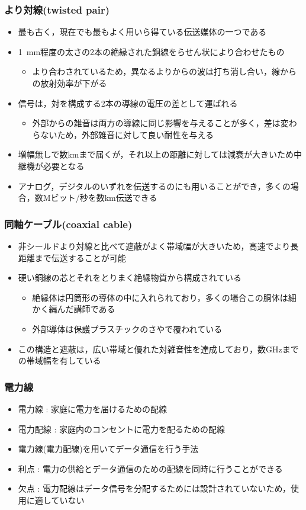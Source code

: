 \documentclass[a4paper]{ltjsarticle}
\begin{document}
		\subsubsection{より対線(twisted pair)}
			\begin{itemize}
				\item 最も古く，現在でも最もよく用いら得ている伝送媒体の一つである
				\item \SI{1}{mm}程度の太さの2本の絶縁された銅線をらせん状により合わせたもの
				\begin{itemize}
					\item より合わされているため，異なるよりからの波は打ち消し合い，線からの放射効率が下がる
				\end{itemize}
				\item 信号は，対を構成する2本の導線の電圧の差として運ばれる
				\begin{itemize}
					\item 外部からの雑音は両方の導線に同じ影響を与えることが多く，差は変わらないため，外部雑音に対して良い耐性を与える
				\end{itemize}
				\item 増幅無しで数kmまで届くが，それ以上の距離に対しては減衰が大きいため中継機が必要となる
				\item アナログ，デジタルのいずれを伝送するのにも用いることができ，多くの場合，数Mビット/秒を数km伝送できる
			\end{itemize}
		\subsubsection{同軸ケーブル(coaxial cable)}
			\begin{itemize}
				\item 非シールドより対線と比べて遮蔽がよく帯域幅が大きいため，高速でより長距離まで伝送することが可能
				\item 硬い銅線の芯とそれをとりまく絶縁物質から構成されている
				\begin{itemize}
					\item 絶縁体は円筒形の導体の中に入れられており，多くの場合この胴体は細かく編んだ講師である
					\item 外部導体は保護プラスチックのさやで覆われている
				\end{itemize}
				\item この構造と遮蔽は，広い帯域と優れた対雑音性を達成しており，数GHzまでの帯域幅を有している
			\end{itemize}
		\subsubsection{電力線}
			\begin{itemize}
				\item 電力線 : 家庭に電力を届けるための配線
				\item 電力配線 : 家庭内のコンセントに電力を配るための配線
				\item 電力線(電力配線)を用いてデータ通信を行う手法
				\item 利点 : 電力の供給とデータ通信のための配線を同時に行うことができる
				\item 欠点 : 電力配線はデータ信号を分配するためには設計されていないため，使用に適していない
			\end{itemize}
\end{document}
